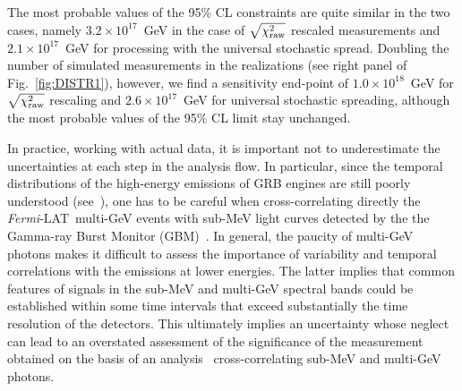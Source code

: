 \documentclass[12pt]{article}
\newcommand{\lat}{{\it Fermi}-LAT}
\begin{document}
{The most probable values of the 95\% CL constraints are quite similar in the two cases, namely
$3.2\times 10^{17}$~GeV in the case of $\sqrt{\chi_{\rm raw}^2}$ rescaled measurements and
$2.1\times 10^{17}$~GeV for processing with the universal stochastic spread.
Doubling the number of simulated measurements in the realizations (see right panel of Fig.~\ref{fig:DISTR1}), however,
we find a sensitivity end-point of $1.0\times 10^{18}$~GeV for $\sqrt{\chi_{\rm raw}^2}$ rescaling
and $2.6 \times 10^{17}$~GeV for universal stochastic spreading, although the most probable values of the 95\% CL
limit stay unchanged.


In practice, working with actual data, it is important
not to underestimate the uncertainties at each step in the analysis flow. In particular, since the temporal distributions of the high-energy emissions
of GRB engines are still poorly understood (see~\cite{HE_GRB}), one has to be careful when cross-correlating directly
the \lat\ multi-GeV events with sub-MeV light curves detected by the the Gamma-ray Burst Monitor (GBM)~\cite{GBM}.
In general, the paucity of multi-GeV photons makes it  difficult to assess the importance of variability and temporal correlations with the
emissions at lower energies.  The latter implies that common features of signals in the sub-MeV and multi-GeV spectral bands could be established
within some time intervals \cite{crossGBMLAT} that exceed substantially the time resolution of the detectors. This ultimately
implies an uncertainty whose neglect can lead to an overstated assessment of the significance of the measurement
obtained on the basis of an analysis~\cite{ch1,ch2,ch3,ch4} cross-correlating sub-MeV and multi-GeV photons.

}
\end{document}
